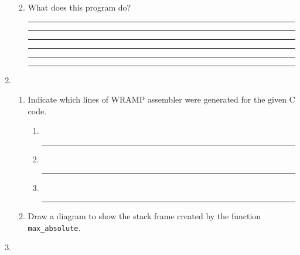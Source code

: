 \documentclass[a4paper,10pt]{article}
\begin{document}
\begin{enumerate}
\begin{enumerate}
\begin{center}
\begin{tabular}{|c|c|c|c|}
\end{tabular}
\end{center}

\item What does this program do?

\vspace{7mm}\hrule\vspace{7mm}\hrule\vspace{7mm}\hrule\vspace{7mm}\hrule
\vspace{7mm}\hrule\vspace{7mm}\hrule\vspace{3mm}

\end{enumerate}

\newpage
\item~
\begin{enumerate}
\item Indicate which lines of WRAMP assembler were generated for the given C code.

\begin{enumerate}
\item~
\vspace{7mm}\hrule\vspace{3mm}
\item~
\vspace{7mm}\hrule\vspace{3mm}
\item~
\vspace{7mm}\hrule\vspace{3mm}

\end{enumerate}

\item Draw a diagram to show the stack frame created by the function \texttt{max\_absolute}.

\begin{center}
\end{center}

\end{enumerate}

\newpage
\item~
\begin{enumerate}


\end{enumerate}
\end{enumerate}
\end{document}
